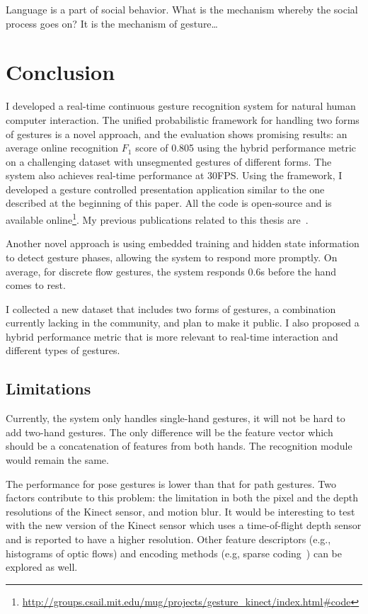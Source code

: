 \begin{savequote}
Language is a part of social behavior. What is the mechanism whereby the social
process goes on? It is the mechanism of gesture\ldots
{}
\end{savequote}
\chapter{Conclusion}
I developed a real-time continuous gesture recognition system for natural
human computer interaction. The
unified probabilistic framework for handling two forms of gestures is a novel
approach, and the evaluation shows promising results: an
average online recognition $F_1$ score of 0.805 using the hybrid performance
metric on a challenging dataset with unsegmented gestures of different forms.
The system also achieves real-time performance at 30FPS. Using the framework, I
developed a gesture controlled presentation application similar to the one described at the beginning of this paper. All the code is open-source
and is available
online\footnote{\url{http://groups.csail.mit.edu/mug/projects/gesture_kinect/index.html\#code}}.
My previous publications related to this thesis are~\cite{yin12, yin10, yin13,
yin13-making}.

Another novel approach is using embedded training and hidden state information
to detect gesture phases, allowing the system to respond more promptly. On
average, for discrete flow gestures, the system responds 0.6s before the hand comes to
rest. 

I collected a new dataset that includes two forms of gestures, a
combination currently lacking in the community, and plan to make it
public. I also proposed a hybrid performance metric
that is more relevant to real-time interaction and different types of gestures.

\section{Limitations}
Currently, the system only handles single-hand gestures, it will not be hard to
add two-hand gestures. The only difference will be the feature vector which
should be a concatenation of features from both hands. The recognition module
would remain the same.

The performance for pose gestures is lower than that
for path gestures. Two factors contribute to this problem: the limitation in
both the pixel and the depth resolutions of the Kinect sensor, and motion blur.
It would be interesting to test with the new version of the Kinect sensor which
uses a time-of-flight depth sensor and is reported to have a higher resolution. Other feature descriptors
(e.g., histograms of optic flows) and encoding methods (e.g, sparse
coding~\cite{lee07}) can be explored as well.

